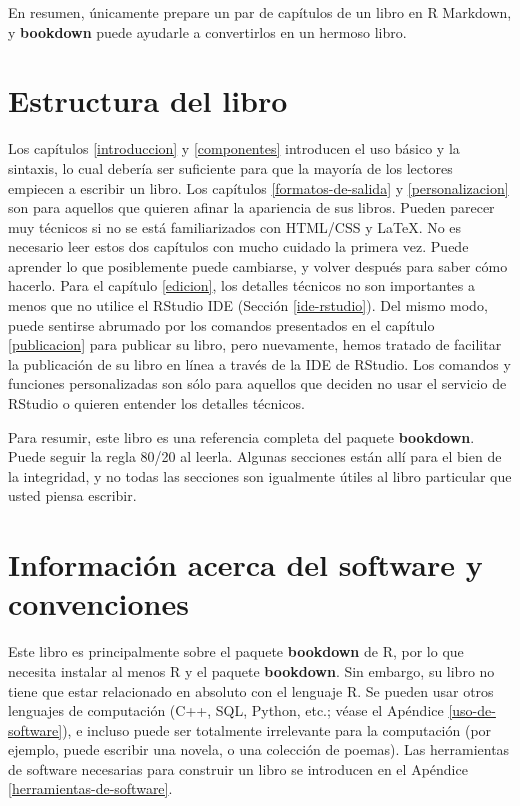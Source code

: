 \documentclass[12pt,]{krantz}
\theoremstyle{definition}
\theoremstyle{definition}
\theoremstyle{remark}
\begin{document}
En resumen, únicamente prepare un par de capítulos de un libro en R
Markdown, y \textbf{bookdown} puede ayudarle a convertirlos en un
hermoso libro.

\section*{Estructura del libro}\label{estructura-del-libro}


Los capítulos \ref{introduccion} y \ref{componentes} introducen el uso
básico y la sintaxis, lo cual debería ser suficiente para que la mayoría
de los lectores empiecen a escribir un libro. Los capítulos
\ref{formatos-de-salida} y \ref{personalizacion} son para aquellos que
quieren afinar la apariencia de sus libros. Pueden parecer muy técnicos
si no se está familiarizados con HTML/CSS y LaTeX. No es necesario leer
estos dos capítulos con mucho cuidado la primera vez. Puede aprender lo
que posiblemente puede cambiarse, y volver después para saber cómo
hacerlo. Para el capítulo \ref{edicion}, los detalles técnicos no son
importantes a menos que no utilice el RStudio IDE (Sección
\ref{ide-rstudio}). Del mismo modo, puede sentirse abrumado por los
comandos presentados en el capítulo \ref{publicacion} para publicar su
libro, pero nuevamente, hemos tratado de facilitar la publicación de su
libro en línea a través de la IDE de RStudio. Los comandos y funciones
personalizadas son sólo para aquellos que deciden no usar el servicio de
RStudio o quieren entender los detalles técnicos.

Para resumir, este libro es una referencia completa del paquete
\textbf{bookdown}. Puede seguir la regla 80/20 al leerla. Algunas
secciones están allí para el bien de la integridad, y no todas las
secciones son igualmente útiles al libro particular que usted piensa
escribir.

\section*{Información acerca del software y
convenciones}\label{informacion-acerca-del-software-y-convenciones}

Este libro es principalmente sobre el paquete \textbf{bookdown} de R,
por lo que necesita instalar al menos R y el paquete \textbf{bookdown}.
Sin embargo, su libro no tiene que estar relacionado en absoluto con el
lenguaje R. Se pueden usar otros lenguajes de computación (C++, SQL,
Python, etc.; véase el Apéndice \ref{uso-de-software}), e incluso puede
ser totalmente irrelevante para la computación (por ejemplo, puede
escribir una novela, o una colección de poemas). Las herramientas de
software necesarias para construir un libro se introducen en el Apéndice
\ref{herramientas-de-software}.
\end{document}
